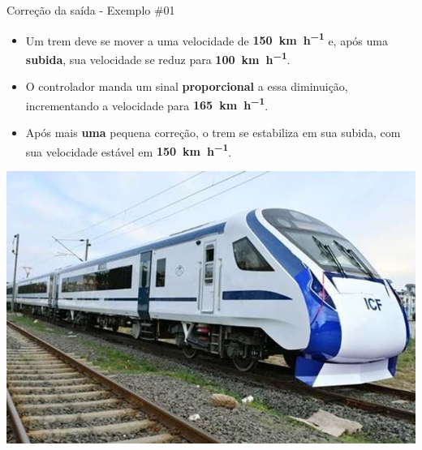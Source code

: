 \begin{frame}{Correção da saída - Exemplo \#01}
	\begin{block}{}
		\begin{itemize}
			\item Um trem deve se mover a uma velocidade de \textbf{\SI{150}{\kilo\meter\per\hour}} e, após uma \textbf{subida}, sua velocidade se reduz para \textbf{\SI{100}{\kilo\meter\per\hour}}.
			\item O controlador manda um sinal \textbf{proporcional} a essa diminuição, incrementando a velocidade para \textbf{\SI{165}{\kilo\meter\per\hour}}.
			\item Após mais \textbf{uma} pequena correção, o trem se estabiliza em sua subida, com sua velocidade estável em \textbf{\SI{150}{\kilo\meter\per\hour}}.
		\end{itemize}
	\end{block}

	\centering
	\includegraphics[height=0.50\textheight]{Figuras/Ch11/fig8}
\end{frame}


